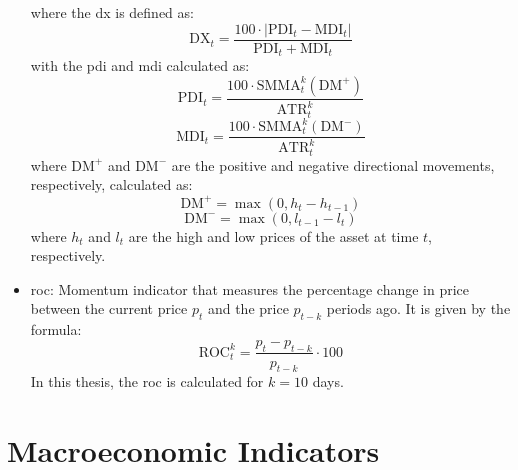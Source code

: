 \begin{itemize}
    where the \acrfull{dx} is defined as:
    \begin{equation}
        \text{DX}_t = \frac{100 \cdot \left| \text{PDI}_t - \text{MDI}_t \right|}{\text{PDI}_t + \text{MDI}_t}
    \end{equation}
    with the \acrfull{pdi} and \acrfull{mdi} calculated as:
    \begin{equation}
        \text{PDI}_t = \frac{100 \cdot \text{SMMA}_t^k ( \text{DM}^+ )}{\text{ATR}_t^k}
    \end{equation}
    \begin{equation}
        \text{MDI}_t = \frac{100 \cdot \text{SMMA}_t^k ( \text{DM}^- )}{\text{ATR}_t^k}
    \end{equation}
    where $\text{DM}^+$ and $\text{DM}^-$ are the positive and negative directional movements, respectively, calculated as:
    \begin{equation}
        \text{DM}^+ = \max \left( 0, h_t - h_{t-1} \right)
    \end{equation}
    \begin{equation}
        \text{DM}^- = \max \left( 0, l_{t-1} - l_t \right)
    \end{equation}
    where $h_t$ and $l_t$ are the high and low prices of the asset at time $t$, respectively. 
    \item \acrfull{roc}: Momentum indicator that measures the percentage change in price between the current price $p_t$ and the price $p_{t-k}$ periods ago. It is given by the formula:
    \begin{equation}
        \text{ROC}_t^k = \frac{p_t - p_{t-k}}{p_{t-k}} \cdot 100
    \end{equation}
    In this thesis, the \acrshort{roc} is calculated for $k=10$ days.
\end{itemize}

\section{Macroeconomic Indicators} \label{sec:macroeconomic-indicators}


